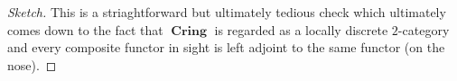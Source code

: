 \documentclass{amsart}
\theoremstyle{definition}
\DeclareMathOperator{\sym}{Sym}
\DeclareMathOperator{\Crig}{\mathbf{Crig}}
\DeclareMathOperator{\Cring}{\mathbf{Cring}}
\DeclareMathOperator{\fCat}{\mathfrak{Cat}}
\newcommand{\CAlg}[1]{\mathbf{CAlg}_{#1}}
\newcommand{\Sym}[1]{\sym_{#1}}
\newcommand{\Mod}[1]{{#1}\textnormal{-}\mathbf{Mod}}
\numberwithin{equation}{subsection}
\begin{document}
\begin{proof}[Sketch]
	This is a striaghtforward but ultimately tedious check which ultimately comes down to the fact that $\Cring$ is regarded as a locally discrete $2$-category and every composite functor in sight is left adjoint to the same functor (on the nose).
\end{proof}
\end{document}

